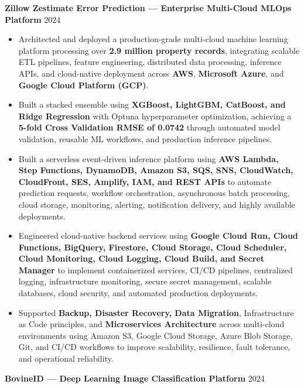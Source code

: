 \documentclass[9pt]{article}
\begin{document}
\textbf{Zillow Zestimate Error Prediction — Enterprise Multi-Cloud MLOps Platform} \hfill 2024

\begin{itemize}

\item Architected and deployed a production-grade multi-cloud machine learning platform processing over \textbf{2.9 million property records}, integrating scalable ETL pipelines, feature engineering, distributed data processing, inference APIs, and cloud-native deployment across \textbf{AWS}, \textbf{Microsoft Azure}, and \textbf{Google Cloud Platform (GCP)}.

\item Built a stacked ensemble using \textbf{XGBoost, LightGBM, CatBoost, and Ridge Regression} with Optuna hyperparameter optimization, achieving a \textbf{5-fold Cross Validation RMSE of 0.0742} through automated model validation, reusable ML workflows, and production inference pipelines.

\item Built a serverless event-driven inference platform using \textbf{AWS Lambda, Step Functions, DynamoDB, Amazon S3, SQS, SNS, CloudWatch, CloudFront, SES, Amplify, IAM, and REST APIs} to automate prediction requests, workflow orchestration, asynchronous batch processing, cloud storage, monitoring, alerting, notification delivery, and highly available deployments.

\item Engineered cloud-native backend services using \textbf{Google Cloud Run, Cloud Functions, BigQuery, Firestore, Cloud Storage, Cloud Scheduler, Cloud Monitoring, Cloud Logging, Cloud Build, and Secret Manager} to implement containerized services, CI/CD pipelines, centralized logging, infrastructure monitoring, secure secret management, scalable databases, cloud security, and automated production deployments.

\item Supported \textbf{Backup, Disaster Recovery, Data Migration}, Infrastructure as Code principles, and \textbf{Microservices Architecture} across multi-cloud environments using Amazon S3, Google Cloud Storage, Azure Blob Storage, Git, and CI/CD workflows to improve scalability, resilience, fault tolerance, and operational reliability.

\end{itemize}

\textbf{BovineID — Deep Learning Image Classification Platform} \hfill 2024
\end{document}
